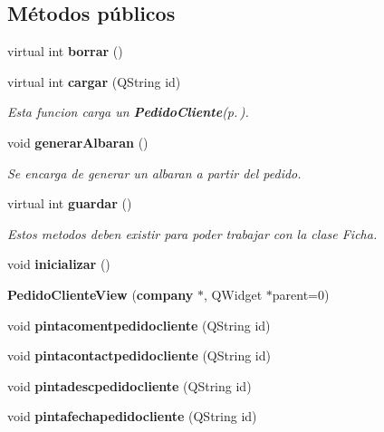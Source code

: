\subsection*{M\'{e}todos p\'{u}blicos}
\begin{CompactItemize}
\item 
virtual int {\bf borrar} ()\label{classPedidoClienteView_a0}

\item 
virtual int {\bf cargar} (QString id)\label{classPedidoClienteView_a1}

\begin{CompactList}\small\item\em Esta funcion carga un {\bf Pedido\-Cliente}{\rm (p.\,\pageref{classPedidoCliente})}. \item\end{CompactList}\item 
void {\bf generar\-Albaran} ()
\begin{CompactList}\small\item\em Se encarga de generar un albaran a partir del pedido. \item\end{CompactList}\item 
virtual int {\bf guardar} ()\label{classPedidoClienteView_a3}

\begin{CompactList}\small\item\em Estos metodos deben existir para poder trabajar con la clase Ficha. \item\end{CompactList}\item 
void {\bf inicializar} ()\label{classPedidoClienteView_a4}

\item 
{\bf Pedido\-Cliente\-View} ({\bf company} $\ast$, QWidget $\ast$parent=0)
\item 
void {\bf pintacomentpedidocliente} (QString id)\label{classPedidoClienteView_a6}

\item 
void {\bf pintacontactpedidocliente} (QString id)\label{classPedidoClienteView_a7}

\item 
void {\bf pintadescpedidocliente} (QString id)\label{classPedidoClienteView_a8}

\item 
void {\bf pintafechapedidocliente} (QString id)\label{classPedidoClienteView_a9}


\end{CompactItemize}
